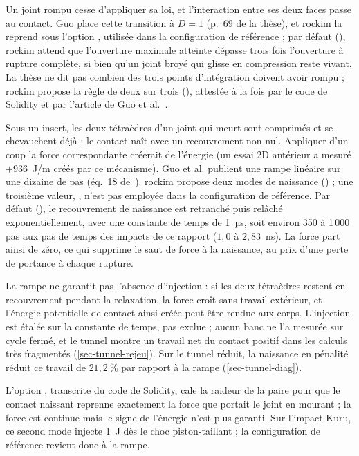 Un joint rompu cesse d'appliquer sa loi, et l'interaction entre ses deux faces passe au contact. Guo place cette transition à $D = 1$ (p.~69 de la thèse), et rockim la reprend sous l'option , utilisée dans la configuration de référence ; par défaut (), rockim attend que l'ouverture maximale atteinte dépasse trois fois l'ouverture à rupture complète, si bien qu'un joint broyé qui glisse en compression reste vivant. La thèse ne dit pas combien des trois points d'intégration doivent avoir rompu ; rockim propose la règle de deux sur trois (), attestée à la fois par le code de Solidity et par l'article de Guo et al.~\cite{guo2020generic}.

Sous un insert, les deux tétraèdres d'un joint qui meurt sont comprimés et se chevauchent déjà : le contact naît avec un recouvrement non nul. Appliquer d'un coup la force correspondante créerait de l'énergie (un essai 2D antérieur a mesuré $+936$~J/m créés par ce mécanisme). Guo et al. publient une rampe linéaire sur une dizaine de pas (éq.~18 de~\cite{guo2020generic}). rockim propose deux modes de naissance () ; une troisième valeur, , n'est pas employée dans la configuration de référence. Par défaut (), le recouvrement de naissance est retranché puis relâché exponentiellement, avec une constante de temps de 1~µs, soit environ 350 à 1\,000 pas aux pas de temps des impacts de ce rapport ($1{,}0$ à $2{,}83$~ns). La force part ainsi de zéro, ce qui supprime le saut de force à la naissance, au prix d'une perte de portance à chaque rupture.

La rampe ne garantit pas l'absence d'injection : si les deux tétraèdres restent en recouvrement pendant la relaxation, la force croît sans travail extérieur, et l'énergie potentielle de contact ainsi créée peut être rendue aux corps. L'injection est étalée sur la constante de temps, pas exclue ; aucun banc ne l'a mesurée sur cycle fermé, et le tunnel montre un travail net du contact positif dans les calculs très fragmentés (\cref{sec-tunnel-rejeu}). Sur le tunnel réduit, la naissance en pénalité réduit ce travail de $21{,}2~\%$ par rapport à la rampe (\cref{sec-tunnel-diag}).

L'option , transcrite du code de Solidity, cale la raideur de la paire pour que le contact naissant reprenne exactement la force que portait le joint en mourant ; la force est continue mais le signe de l'énergie n'est plus garanti. Sur l'impact Kuru, ce second mode injecte 1~J dès le choc piston-taillant ; la configuration de référence revient donc à la rampe.

